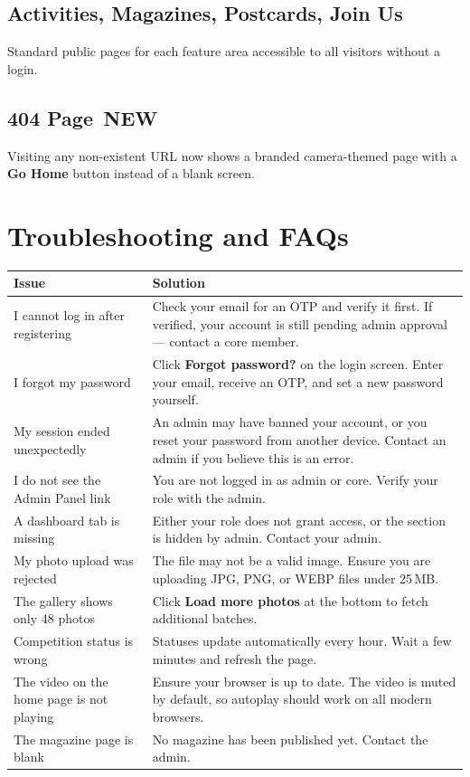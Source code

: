 \documentclass[12pt,a4paper]{article}
\newcommand{\newbadge}{%
  \colorbox{NewFrame}{\color{white}\,\textbf{\footnotesize NEW}\,}%
}
\begin{document}
\subsection{Activities, Magazines, Postcards, Join Us}

Standard public pages for each feature area accessible to all visitors without a login.

\subsection{404 Page \newbadge}

Visiting any non-existent URL now shows a branded camera-themed page with a \textbf{Go Home} button instead of a blank screen.

\section{Troubleshooting and FAQs}

\renewcommand{\arraystretch}{1.5}
\begin{tabularx}{\linewidth}{L{5.8cm} X}
\toprule
\textbf{Issue} & \textbf{Solution} \\
\midrule
I cannot log in after registering & Check your email for an OTP and verify it first. If verified, your account is still pending admin approval --- contact a core member. \\
I forgot my password & Click \textbf{Forgot password?} on the login screen. Enter your email, receive an OTP, and set a new password yourself. \\
My session ended unexpectedly & An admin may have banned your account, or you reset your password from another device. Contact an admin if you believe this is an error. \\
I do not see the Admin Panel link & You are not logged in as admin or core. Verify your role with the admin. \\
A dashboard tab is missing & Either your role does not grant access, or the section is hidden by admin. Contact your admin. \\
My photo upload was rejected & The file may not be a valid image. Ensure you are uploading JPG, PNG, or WEBP files under 25\,MB. \\
The gallery shows only 48 photos & Click \textbf{Load more photos} at the bottom to fetch additional batches. \\
Competition status is wrong & Statuses update automatically every hour. Wait a few minutes and refresh the page. \\
The video on the home page is not playing & Ensure your browser is up to date. The video is muted by default, so autoplay should work on all modern browsers. \\
The magazine page is blank & No magazine has been published yet. Contact the admin. \\
\bottomrule
\end{tabularx}
\end{document}
